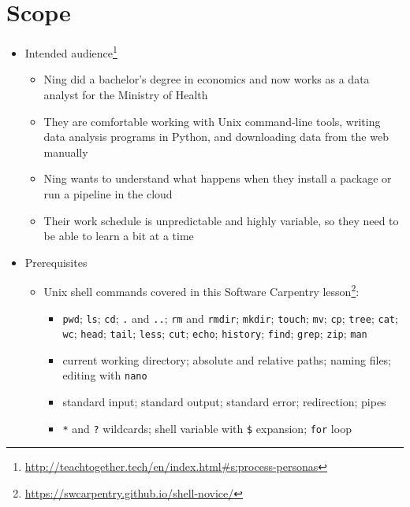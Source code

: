 \documentclass[krantzl]{krantz}
\newcommand{\hreffoot}[2]{{#1}\footnote{\href{#2}{#2}}}
\begin{document}
\section{Scope}
\begin{itemize}
\item \hreffoot{Intended audience}{http://teachtogether.tech/en/index.html#s:process-personas}\begin{itemize}
\item Ning did a bachelor’s degree in economics
    and now works as a data analyst for the Ministry of Health

\item They are comfortable working with Unix command-line tools,
    writing data analysis programs in Python,
and downloading data from the web manually

\item Ning wants to understand what happens when they install a package
or run a pipeline in the cloud

\item Their work schedule is unpredictable and highly variable,
    so they need to be able to learn a bit at a time

\end{itemize}


\item Prerequisites\begin{itemize}
\item Unix shell commands covered in \hreffoot{this Software Carpentry lesson}{https://swcarpentry.github.io/shell-novice/}:\begin{itemize}
\item \texttt{pwd}; \texttt{ls}; \texttt{cd}; \texttt{.} and \texttt{..}; \texttt{rm} and \texttt{rmdir}; \texttt{mkdir}; \texttt{touch};
    \texttt{mv}; \texttt{cp}; \texttt{tree}; \texttt{cat}; \texttt{wc}; \texttt{head}; \texttt{tail}; \texttt{less}; \texttt{cut}; \texttt{echo};
    \texttt{history}; \texttt{find}; \texttt{grep}; \texttt{zip}; \texttt{man}

\item current working directory; absolute and relative paths; naming files;
    editing with \texttt{nano}

\item standard input; standard output; standard error; redirection; pipes

\item \texttt{*} and \texttt{?} wildcards; shell variable with \texttt{\$} expansion; \texttt{for} loop


\end{itemize}
\end{itemize}
\end{itemize}
\end{document}
